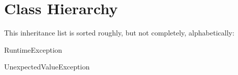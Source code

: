 \section{Class Hierarchy}
This inheritance list is sorted roughly, but not completely, alphabetically\-:\begin{DoxyCompactList}
\item Runtime\-Exception\begin{DoxyCompactList}
\item {}
\end{DoxyCompactList}
\item Unexpected\-Value\-Exception\begin{DoxyCompactList}
\item {}
\item {}
\end{DoxyCompactList}
\item {}
\end{DoxyCompactList}
